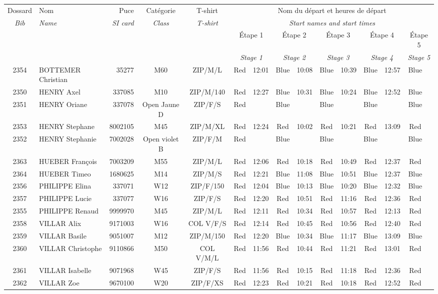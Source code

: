 \documentclass{report}
\begin{document}
  \begin{longtable}{|c|l|r|c|c|*{5}{cc|}}
    Dossard & Nom  & Puce    & Catégorie & T-shirt & \multicolumn{10}{c|}{Nom du départ et heures de départ} \\
    \itshape Bib     & \itshape Name & \itshape SI card & \itshape Class  & \itshape  T-shirt  & \multicolumn{10}{c|}{\itshape Start names and start times} \\
    \hline
    & & & & & \multicolumn{2}{c|}{Étape 1} & \multicolumn{2}{c|}{Étape 2} & \multicolumn{2}{c|}{Étape 3} & \multicolumn{2}{c|}{Étape 4} & \multicolumn{2}{c|}{Étape 5} \\
    & & & & & \multicolumn{2}{c|}{\itshape Stage 1} & \multicolumn{2}{c|}{\itshape Stage 2} & \multicolumn{2}{c|}{\itshape Stage 3} & \multicolumn{2}{c|}{\itshape Stage 4} & \multicolumn{2}{c|}{\itshape Stage 5} \\
    \hline
    2354 & BOTTEMER Christian & 35277 & M60 & ZIP/M/L & Red & 12:01 & Blue & 10:08 & Blue & 10:39 & Blue & 12:57 & Blue &  \\
    2350 & HENRY Axel & 337085 & M10 & ZIP/M/140 & Red & 12:27 & Blue & 10:31 & Blue & 10:24 & Blue & 12:52 & Blue &  \\
    2351 & HENRY Oriane & 337078 & Open Jaune D & ZIP/F/S & Red &   & Blue &   & Blue &   & Blue &   & Blue &  \\
    2353 & HENRY Stephane & 8002105 & M45 & ZIP/M/XL & Red & 12:24 & Red & 10:02 & Red & 10:21 & Red & 13:09 & Red &  \\
    2352 & HENRY Stephanie & 7002028 & Open violet B & ZIP/F/M & Red &   & Blue &   & Blue &   & Blue &   & Blue &  \\
    2363 & HUEBER François & 7003209 & M55 & ZIP/M/L & Red & 12:06 & Red & 10:18 & Red & 10:49 & Red & 12:37 & Red &  \\
    2364 & HUEBER Timeo & 1680625 & M14 & ZIP/M/S & Red & 12:21 & Blue & 11:08 & Blue & 10:51 & Blue & 12:37 & Blue &  \\
    2356 & PHILIPPE Elina & 337071 & W12 & ZIP/F/150 & Red & 12:04 & Blue & 10:13 & Blue & 10:20 & Blue & 12:32 & Blue &  \\
    2357 & PHILIPPE Lucie & 337077 & W16 & ZIP/F/S & Red & 12:20 & Red & 10:51 & Red & 11:16 & Red & 12:36 & Red &  \\
    2355 & PHILIPPE Renaud & 9999970 & M45 & ZIP/M/L & Red & 12:11 & Red & 10:34 & Red & 10:57 & Red & 12:13 & Red &  \\
    2358 & VILLAR Alix & 9171003 & W16 & COL V/F/S & Red & 12:14 & Red & 10:45 & Red & 10:56 & Red & 12:40 & Red &  \\
    2359 & VILLAR Basile & 9051007 & M12 & ZIP/M/150 & Red & 12:20 & Blue & 10:34 & Blue & 11:17 & Blue & 13:09 & Blue &  \\
    2360 & VILLAR Christophe & 9110866 & M50 & COL V/M/L & Red & 11:56 & Red & 10:44 & Red & 11:21 & Red & 13:01 & Red &  \\
    2361 & VILLAR Isabelle & 9071968 & W45 & ZIP/F/S & Red & 11:56 & Red & 10:15 & Red & 11:18 & Red & 12:36 & Red &  \\
    2362 & VILLAR Zoe & 9670100 & W20 & ZIP/F/XS & Red & 12:23 & Red & 10:21 & Red & 10:18 & Red & 12:52 & Red &  \\
  \end{longtable}
\end{document}
